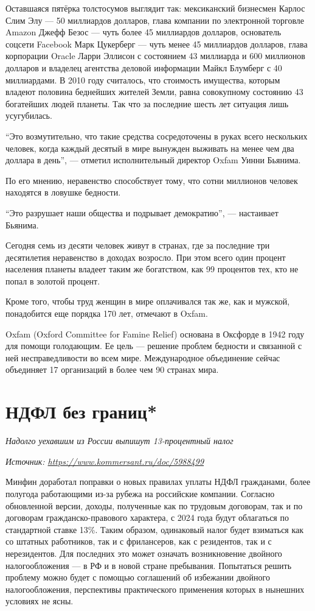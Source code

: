 Оставшаяся пятёрка толстосумов выглядит так: мексиканский бизнесмен Карлос Слим Элу --- 50 миллиардов долларов, глава компании по электронной торговле Amazon Джефф Безос --- чуть более 45 миллиардов долларов, основатель соцсети Facebook Марк Цукерберг --- чуть менее 45 миллиардов долларов, глава корпорации Oracle Ларри Эллисон с состоянием 43 миллиарда и 600 миллионов долларов и владелец агентства деловой информации Майкл Блумберг с 40 миллиардами.
В 2010 году считалось, что стоимость имущества, которым владеют половина беднейших жителей Земли, равна совокупному состоянию 43 богатейших людей планеты. Так что за последние шесть лет ситуация лишь усугубилась.

``Это возмутительно, что такие средства сосредоточены в руках всего нескольких человек, когда каждый десятый в мире вынужден выживать на менее чем два доллара в день'', --- отметил исполнительный директор Oxfam Уинни Бьянима.

По его мнению, неравенство способствует тому, что сотни миллионов человек находятся в ловушке бедности.

``Это разрушает наши общества и подрывает демократию'', --- настаивает Бьянима.

Сегодня семь из десяти человек живут в странах, где за последние три десятилетия неравенство в доходах возросло. При этом всего один процент населения планеты владеет таким же богатством, как 99 процентов тех, кто не попал в золотой процент.

Кроме того, чтобы труд женщин в мире оплачивался так же, как и мужской, понадобится еще порядка 170 лет, отмечают в Oxfam.

Oxfam (Oxford Committee for Famine Relief) основана в Оксфорде в 1942 году для помощи голодающим. Ее цель --- решение проблем бедности и связанной с ней несправедливости во всем мире. Международное объединение сейчас объединяет 17 организаций в более чем 90 странах мира.

\newpage
\section{НДФЛ без границ*}
\textit{Надолго уехавшим из России выпишут 13-процентный налог}

{\it Источник: \url{https://www.kommersant.ru/doc/5988499}}

Минфин доработал поправки о новых правилах уплаты НДФЛ гражданами, более полугода работающими из-за рубежа на российские компании. Согласно обновленной версии, доходы, полученные как по трудовым договорам, так и по договорам гражданско-правового характера, с 2024 года будут облагаться по стандартной ставке 13\%. Таким образом, одинаковый налог будет взиматься как со штатных работников, так и с фрилансеров, как с резидентов, так и с нерезидентов. Для последних это может означать возникновение двойного налогообложения — в РФ и в новой стране пребывания. Попытаться решить проблему можно будет с помощью соглашений об избежании двойного налогообложения, перспективы практического применения которых в нынешних условиях не ясны.

